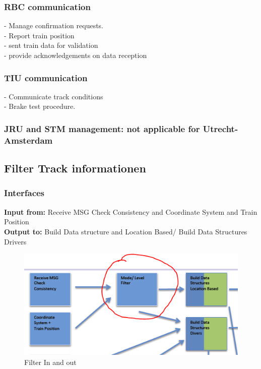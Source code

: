\documentclass{template/openetcs_report}
\begin{document}
\subsubsection{RBC communication}
- Manage confirmation requests.\\
- Report train position\\
- sent train data for validation\\
- provide acknowledgements on data reception\\

\subsubsection{TIU communication}
- Communicate track conditions\\
- Brake test procedure.\\

\subsubsection{JRU and \gls{STM} management: not applicable for Utrecht-Amsterdam}

\newpage
\subsection{Filter Track informationen}

\subsubsection{Interfaces}
\textbf{Input from:} Receive MSG Check Consistency and Coordinate System and Train Position\\
\textbf{Output to:} Build Data structure and Location Based/ Build Data Structures Drivers\\
\begin{figure}[hbtp]
\centering
\includegraphics[scale=0.7]{images/FilterInandOUt}
\caption{Filter In and out}
\end{figure}
\end{document}
